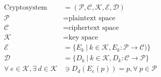 \documentclass{article}
\begin{document}
\begin{align*}
        \text{Cryptosystem} &= \mathscr{(P, C, K, E, D)} \\
        \mathscr{P} &= \text{plaintext space} \\
        \mathscr{C} &= \text{ciphertext space} \\
        \mathscr{K} &= \text{key space} \\
        \mathscr{E} &= \{E_k\ |\ k \in \mathscr{K}, 
                         E_k : \mathscr{P} \rightarrow 
                        \mathscr{C})\} \\
        \mathscr{D} &= \{D_k\ |\ k \in \mathscr{K},
                         D_k : \mathscr{C} \rightarrow
                         \mathscr{P}\} \\
        \forall\ e \in \mathscr{K}, \exists\ d \in \mathscr{K} 
        &\ni D_d(E_e(p)) = p, \forall\ p \in \mathscr{P}
\end{align*}
\end{document}

